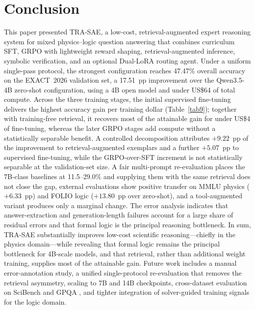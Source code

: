 \documentclass[APA,twocolumn]{USG}
\newcommand{\modelname}{TRA-SAE}
\newcommand{\basemodelname}{Qwen3.5-4B}
\newcommand{\dataset}{EXACT~2026}
\begin{document}
\section{Conclusion}\label{sec8}

This paper presented \modelname{}, a low-cost, retrieval-augmented expert
reasoning system for mixed physics--logic question answering that combines
curriculum SFT, GRPO with lightweight reward shaping, retrieval-augmented
inference, symbolic verification, and an optional Dual-LoRA routing agent. Under a uniform single-pass protocol, the strongest
configuration reaches 47.47\% overall accuracy on the \dataset{} validation set,
a 17.51~pp improvement over the \basemodelname{} zero-shot configuration, using a
4B open model and under US\$64 of total compute. Across the three training
stages, the initial supervised fine-tuning delivers the highest accuracy gain per
training dollar (Table~\ref{tab9}); together with training-free retrieval, it
recovers most of the attainable gain for under US\$4 of fine-tuning, whereas the
later GRPO stages add compute without a statistically separable benefit. A
controlled
decomposition attributes $+9.22$~pp of the improvement to retrieval-augmented
exemplars and a further $+5.07$~pp to supervised fine-tuning, while the
GRPO-over-SFT increment is not statistically separable at the validation-set
size. A fair multi-prompt re-evaluation places the 7B-class baselines at
11.5--29.0\% and supplying them with the same retrieval does not close the gap,
external evaluations show positive transfer on MMLU physics ($+6.33$~pp) and
FOLIO logic ($+13.80$~pp over zero-shot), and a tool-augmented variant produces
only a marginal change. The error analysis indicates that answer-extraction and
generation-length failures account for a large share of residual errors and that
formal logic is the principal reasoning bottleneck. In sum, \modelname{}
substantially improves low-cost scientific reasoning---chiefly in the physics
domain---while revealing that formal logic remains the principal bottleneck for
4B-scale models, and that retrieval, rather than additional weight training,
supplies most of the attainable gain. Future work includes a
manual error-annotation study, a unified single-protocol re-evaluation that
removes the retrieval asymmetry, scaling to 7B and 14B checkpoints, cross-dataset
evaluation on SciBench \citep{Wang2024scibench} and GPQA \citep{Rein2023}, and
tighter integration of solver-guided training signals for the logic domain.
\end{document}
